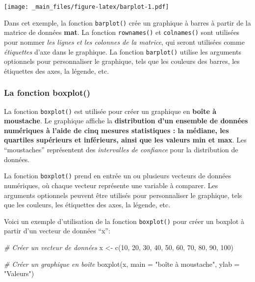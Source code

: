 \documentclass[
]{article}
\newenvironment{Shaded}{\begin{snugshade}}{\end{snugshade}}
\newcommand{\AttributeTok}[1]{\textcolor[rgb]{0.77,0.63,0.00}{#1}}
\newcommand{\CommentTok}[1]{\textcolor[rgb]{0.56,0.35,0.01}{\textit{#1}}}
\newcommand{\DecValTok}[1]{\textcolor[rgb]{0.00,0.00,0.81}{#1}}
\newcommand{\FunctionTok}[1]{\textcolor[rgb]{0.00,0.00,0.00}{#1}}
\newcommand{\NormalTok}[1]{#1}
\newcommand{\OtherTok}[1]{\textcolor[rgb]{0.56,0.35,0.01}{#1}}
\newcommand{\StringTok}[1]{\textcolor[rgb]{0.31,0.60,0.02}{#1}}
\begin{document}
\texttt{[image: \_main\_files/figure-latex/barplot-1.pdf]}

Dans cet exemple, la fonction \texttt{barplot()} crée un graphique à barres à partir de la matrice de données \textbf{mat}. La fonction \texttt{rownames()} et \texttt{colnames()} sont utilisées pour nommer \emph{les lignes et les colonnes de la matrice}, qui seront utilisées comme \emph{étiquettes} d'axe dans le graphique. La fonction \texttt{barplot()} utilise les arguments optionnels pour personnaliser le graphique, tels que les couleurs des barres, les étiquettes des axes, la légende, etc.

\hypertarget{la-fonction-boxplot}{%
\subsubsection{La fonction boxplot()}\label{la-fonction-boxplot}}

La fonction \texttt{boxplot()} est utilisée pour créer un graphique en \textbf{boîte à moustache}. Le graphique affiche la \textbf{distribution d'un ensemble de données numériques à l'aide de cinq mesures statistiques : la médiane, les quartiles supérieurs et inférieurs, ainsi que les valeurs min et max}. Les ``moustaches'' représentent des \emph{intervalles de confiance} pour la distribution de données.

La fonction \texttt{boxplot()} prend en entrée un ou plusieurs vecteurs de données numériques, où chaque vecteur représente une variable à comparer. Les arguments optionnels peuvent être utilisés pour personnaliser le graphique, tels que les couleurs, les étiquettes des axes, la légende, etc.

Voici un exemple d'utilisation de la fonction \texttt{boxplot()} pour créer un boxplot à partir d'un vecteur de données ``x'':

\begin{Shaded}
\begin{Highlighting}[]
\CommentTok{\# Créer un vecteur de données}
\NormalTok{x }\OtherTok{\textless{}{-}} \FunctionTok{c}\NormalTok{(}\DecValTok{10}\NormalTok{, }\DecValTok{20}\NormalTok{, }\DecValTok{30}\NormalTok{, }\DecValTok{40}\NormalTok{, }\DecValTok{50}\NormalTok{, }\DecValTok{60}\NormalTok{, }\DecValTok{70}\NormalTok{, }\DecValTok{80}\NormalTok{, }\DecValTok{90}\NormalTok{, }\DecValTok{100}\NormalTok{)}

\CommentTok{\# Créer un graphique en boîte}
\FunctionTok{boxplot}\NormalTok{(x, }\AttributeTok{main =} \StringTok{"boîte à moustache"}\NormalTok{, }\AttributeTok{ylab =} \StringTok{"Valeurs"}\NormalTok{)}
\end{Highlighting}
\end{Shaded}
\end{document}
